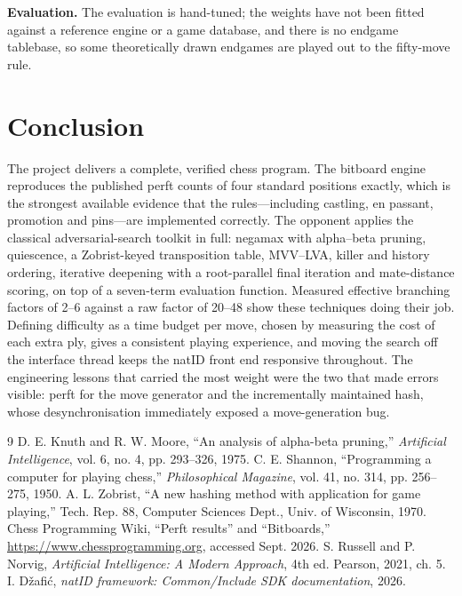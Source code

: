 \documentclass[conference]{IEEEtran}
\begin{document}
\textbf{Evaluation.} The evaluation is hand-tuned; the weights have not been fitted against a reference engine or a game database, and there is no endgame tablebase, so some theoretically drawn endgames are played out to the fifty-move rule.

\section{Conclusion}
The project delivers a complete, verified chess program. The bitboard engine reproduces the published perft counts of four standard positions exactly, which is the strongest available evidence that the rules---including castling, en passant, promotion and pins---are implemented correctly. The opponent applies the classical adversarial-search toolkit in full: negamax with alpha--beta pruning, quiescence, a Zobrist-keyed transposition table, MVV--LVA, killer and history ordering, iterative deepening with a root-parallel final iteration and mate-distance scoring, on top of a seven-term evaluation function. Measured effective branching factors of 2--6 against a raw factor of 20--48 show these techniques doing their job. Defining difficulty as a time budget per move, chosen by measuring the cost of each extra ply, gives a consistent playing experience, and moving the search off the interface thread keeps the natID front end responsive throughout. The engineering lessons that carried the most weight were the two that made errors visible: perft for the move generator and the incrementally maintained hash, whose desynchronisation immediately exposed a move-generation bug.

\begin{thebibliography}{9}
 D. E. Knuth and R. W. Moore, ``An analysis of alpha-beta pruning,'' \emph{Artificial Intelligence}, vol. 6, no. 4, pp. 293--326, 1975.
 C. E. Shannon, ``Programming a computer for playing chess,'' \emph{Philosophical Magazine}, vol. 41, no. 314, pp. 256--275, 1950.
 A. L. Zobrist, ``A new hashing method with application for game playing,'' Tech. Rep. 88, Computer Sciences Dept., Univ. of Wisconsin, 1970.
 Chess Programming Wiki, ``Perft results'' and ``Bitboards,'' \url{https://www.chessprogramming.org}, accessed Sept. 2026.
 S. Russell and P. Norvig, \emph{Artificial Intelligence: A Modern Approach}, 4th ed. Pearson, 2021, ch. 5.
 I. D\v{z}afi\'c, \emph{natID framework: Common/Include SDK documentation}, 2026.
\end{thebibliography}
\end{document}
